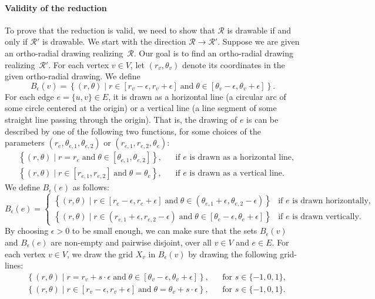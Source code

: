 \documentclass{theoretics}
\newcommand{\RR}{\mathcal{R}}
\begin{document}
\paragraph{Validity of the reduction} To prove that the reduction is valid, we need to show that $\RR$ is drawable if and only if $\RR'$ is drawable. We start with the direction $\RR \rightarrow \RR'$. Suppose we are given an ortho-radial drawing realizing~$\RR$. Our goal is to find an ortho-radial drawing realizing~$\RR'$. 
For each vertex $v \in V$, let $(r_{v}, \theta_v)$ denote its coordinates in the given ortho-radial drawing. We define 
\[B_{\epsilon}(v) = \left\{ (r, \theta) \mid r\in[r_{v} - \epsilon, r_{v} + \epsilon] \; \text{and} \; \theta \in [\theta_v - \epsilon, \theta_v + \epsilon]\right\}.\]
For each edge $e = \{u,v\} \in E$, it is drawn as a horizontal line (a circular arc of some circle centered
at the origin) or a vertical line
 (a line segment of some straight line passing through the origin). That is, the drawing of $e$ is can be described by one of the following two functions, for some choices of the parameters $(r_e, \theta_{e,1}, \theta_{e,2})$ or $(r_{e,1}, r_{e,2}, \theta_e)$:
\begin{align*}
    & \left\{ (r, \theta) \mid r= r_e \; \text{and} \; \theta \in [\theta_{e,1}, \theta_{e,2}]\right\}, && \text{if $e$ is drawn as a horizontal line,}\\
    & \left\{ (r, \theta) \mid r\in[r_{e,1}, r_{e,2}] \; \text{and} \; \theta = \theta_e\right\},  && \text{if $e$ is drawn as a vertical line.}
\end{align*}
We define $B_{\epsilon}(e)$ as follows:
\[
B_{\epsilon}(e) = 
\begin{cases}
\left\{ (r, \theta) \mid r\in[r_e - \epsilon, r_e + \epsilon] \; \text{and} \; \theta\in(\theta_{e,1} + \epsilon, \theta_{e,2} - \epsilon)\right\}
& \text{if $e$ is drawn horizontally,}\\
\left\{ (r, \theta) \mid r\in(r_{e,1} + \epsilon, r_{e,2} - \epsilon) \; \text{and} \; \theta \in [\theta_e - \epsilon, \theta_e + \epsilon]\right\}
& \text{if $e$ is drawn vertically.}
\end{cases}
\]
By choosing $\epsilon > 0$ to be small enough, we can make sure that the sets $B_\epsilon(v)$ and $B_\epsilon(e)$ are non-empty and pairwise disjoint, over all $v\in V$ and $e\in E$. For each vertex $v\in V$, we draw the grid $X_v$ in $B_\epsilon(v)$ by drawing the following grid-lines:
\begin{align*}
    & \left\{ (r, \theta) \mid r= r_v +  s \cdot \epsilon \; \text{and} \; \theta \in [\theta_v - \epsilon, \theta_v + \epsilon]\right\},  && \text{for $s \in \{-1, 0, 1\}$,}\\
    & \left\{ (r, \theta) \mid r\in[r_{v} - \epsilon, r_{v} + \epsilon] \; \text{and} \; \theta = \theta_v + s \cdot \epsilon \right\},  && \text{for $s \in \{-1, 0, 1\}$.}
\end{align*}
\end{document}
